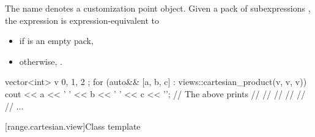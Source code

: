 \pnum
The name  denotes a customization point object.
Given a pack of subexpressions ,
the expression 
is expression-equivalent to
\begin{itemize}
\item
{}
if  is an empty pack,
\item
otherwise,
.
\end{itemize}

\pnum
\begin{example}
\begin{codeblock}
vector<int> v { 0, 1, 2 };
for (auto&& [a, b, c] : views::cartesian_product(v, v, v)) {
  cout << a << ' ' << b << ' ' << c << '\n';
}
// The above prints
// 
// 
// 
// 
// 
// ...
\end{codeblock}
\end{example}

[range.cartesian.view]{Class template }

